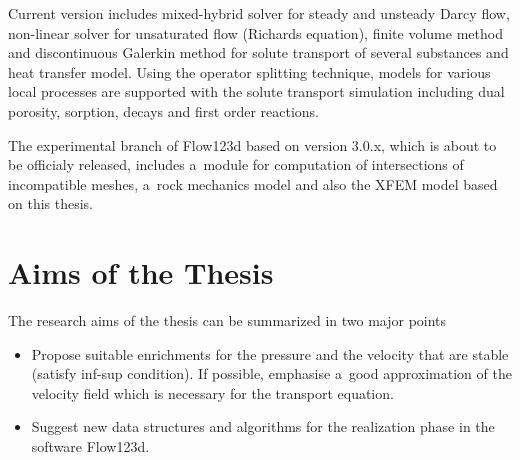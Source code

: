 Current version includes mixed-hybrid solver for steady and unsteady Darcy flow, non-linear solver for unsaturated flow (Richards equation),
finite volume method and discontinuous Galerkin method for solute transport of several substances and heat transfer model. 
Using the operator splitting technique, models for various local processes are supported with the solute transport simulation
including dual porosity, sorption, decays and first order reactions.

The experimental branch of Flow123d based on version 3.0.x, which is about to be officialy released,
includes a~module for computation of intersections of incompatible meshes,
a~rock mechanics model and also the XFEM model based on this thesis.






\section{Aims of the Thesis}\label{chap:aims}

The research aims of the thesis can be summarized in two major points
\begin{itemize}
  \item Propose suitable enrichments for the pressure and the velocity that are stable (satisfy inf-sup condition). 
        If possible, emphasise a~good approximation of the velocity field which is necessary for the transport equation.
        
  \item Suggest new data structures and algorithms for the realization phase in the software Flow123d. 
\end{itemize}

